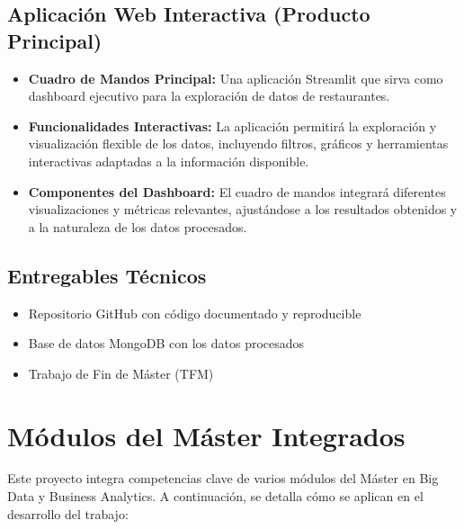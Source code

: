 \documentclass[12pt,a4paper]{article}
\begin{document}
\subsection{Aplicación Web Interactiva (Producto Principal)}

\begin{itemize}[label=\textbullet]
    \item \textbf{Cuadro de Mandos Principal:} Una aplicación Streamlit que sirva como dashboard ejecutivo para la exploración de datos de restaurantes.
    
    \item \textbf{Funcionalidades Interactivas:} La aplicación permitirá la exploración y visualización flexible de los datos, incluyendo filtros, gráficos y herramientas interactivas adaptadas a la información disponible.
    
    \item \textbf{Componentes del Dashboard:} El cuadro de mandos integrará diferentes visualizaciones y métricas relevantes, ajustándose a los resultados obtenidos y a la naturaleza de los datos procesados.
\end{itemize}

\subsection{Entregables Técnicos}

\begin{itemize}[label=\textbullet]
    \item Repositorio GitHub con código documentado y reproducible
    \item Base de datos MongoDB con los datos procesados
    \item Trabajo de Fin de Máster (TFM)
\end{itemize}

\section{Módulos del Máster Integrados}

Este proyecto integra competencias clave de varios módulos del Máster en Big Data y Business Analytics. A continuación, se detalla cómo se aplican en el desarrollo del trabajo:
\end{document}
